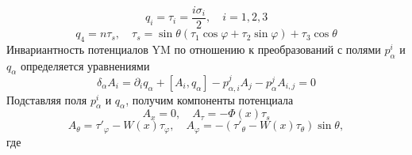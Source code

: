 \documentclass[12pt]{article}
\theoremstyle{definition}
\begin{document}
\begin{equation}
    q_i=\tau_i=\frac{i\sigma_i}{2},\quad i=1,2,3
\end{equation}
\begin{equation}
    q_4=n\tau_s,\quad\tau_s=\sin\theta(\tau_1\cos\varphi+\tau_2\sin\varphi)+\tau_3\cos\theta
\end{equation}
Инвариантность потенциалов YM по отношению к преобразований с полями $p^i_\alpha$ и $q_\alpha$ определяется уравнениями
\begin{equation}
    \delta_\alpha A_i=\partial_iq_\alpha+[A_i,q_\alpha]-p^j_{\alpha,i}A_j-p^j_\alpha A_{i,j}=0
\end{equation}
Подставляя поля $p^i_\alpha$ и $q_\alpha$, получим компоненты потенциала
\begin{equation}
    A_x=0,\quad A_\tau=-\Phi(x)\tau_s
\end{equation}
\begin{equation}
    A_\theta=\tau'_\varphi-W(x)\tau_\varphi,\quad A_\varphi=-(\tau'_\theta-W(x)\tau_\theta)\sin\theta,
\end{equation}
где
\end{document}
